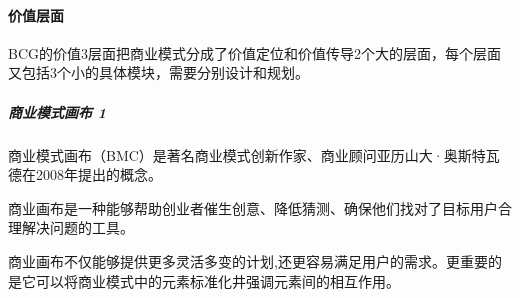 \documentclass[letterpaper,11pt,english]{sphinxmanual}
\begin{document}
\paragraph{价值层面}
\label{\detokenize{chapter_idea/business:id13}}
BCG的价值3层面把商业模式分成了价值定位和价值传导2个大的层面，每个层面又包括3个小的具体模块，需要分别设计和规划。
%
\begin{footnote}[340]\sphinxAtStartFootnote
{}
%
\end{footnote}


\subparagraph{商业模式画布 1\sphinxfootnotemark[341]}
\label{\detokenize{chapter_idea/business:id14}}%
\begin{footnotetext}[341]\sphinxAtStartFootnote
{}
%
\end{footnotetext}\ignorespaces 
商业模式画布（BMC）是著名商业模式创新作家、商业顾问亚历山大·奥斯特瓦德在2008年提出的概念。

商业画布是一种能够帮助创业者催生创意、降低猜测、确保他们找对了目标用户合理解决问题的工具。

商业画布不仅能够提供更多灵活多变的计划,还更容易满足用户的需求。更重要的是它可以将商业模式中的元素标准化井强调元素间的相互作用。
\end{document}
